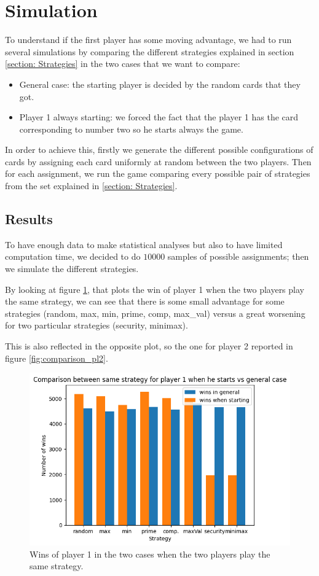 \section{Simulation} \label{section:Simulation} %
To understand if the first player has some moving advantage, we had to run several simulations by comparing the different strategies explained in section \ref{section: Strategies} in the two cases that we want to compare:
\begin{itemize}
    \item General case: the starting player is decided by the random cards that they got.
    \item Player 1 always starting: we forced the fact that the player 1 has the card corresponding to number two so he starts always the game.
\end{itemize}
In order to achieve this, firstly we generate the different possible configurations of cards by assigning each card uniformly at random between the two players. Then for each assignment, we run the game comparing every possible pair of strategies from the set explained in \ref{section: Strategies}.

\subsection{Results} \label{subsection:Results}
To have enough data to make statistical analyses but also to have limited computation time, we decided to do $10 000$ samples of possible assignments; then we simulate the different strategies.


By looking at figure \ref{fig:comparison_pl1}, that plots the win of player 1 when the two players play the same strategy, we can see that there is some small advantage for some strategies (random, max, min, prime, comp, max\_val) versus a great worsening for two particular strategies (security, minimax).

This is also reflected in the opposite plot, so the one for player 2 reported in figure \ref{fig:comparison_pl2}.

\begin{figure}
    \centering
    \includegraphics[width=0.7\linewidth]{img/comparison_winning_starts_general_pl1.png}
    \caption{Wins of player 1 in the two cases when the two players play the same strategy.}
    \label{fig:comparison_pl1}
\end{figure}

